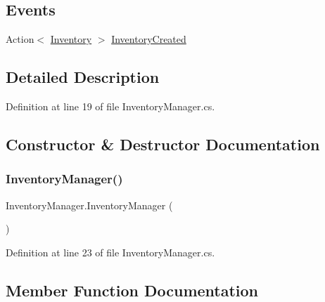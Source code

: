 \subsection*{Events}
\begin{DoxyCompactItemize}
\item 
Action$<$ \hyperlink{class_inventory}{Inventory} $>$ \hyperlink{class_inventory_manager_a43cc3e8fdd6ecf3a16dd5829df28e03a}{Inventory\+Created}
\end{DoxyCompactItemize}


\subsection{Detailed Description}


Definition at line 19 of file Inventory\+Manager.\+cs.



\subsection{Constructor \& Destructor Documentation}
\mbox{\label{class_inventory_manager_a76f6f27a62942c1ca5017b0f258b2c72}} 
\subsubsection{\texorpdfstring{Inventory\+Manager()}{InventoryManager()}}
{\footnotesize\ttfamily Inventory\+Manager.\+Inventory\+Manager (\begin{DoxyParamCaption}{ }\end{DoxyParamCaption})}



Definition at line 23 of file Inventory\+Manager.\+cs.



\subsection{Member Function Documentation}
\mbox{\label{class_inventory_manager_a11f61f89cbd6c1525960f18dd2726d6f}} 
